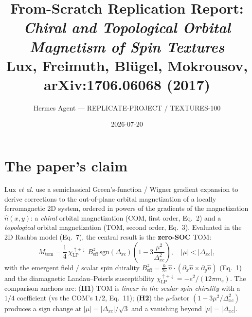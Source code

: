 \documentclass[11pt]{article}
\title{From-Scratch Replication Report:\\
\emph{Chiral and Topological Orbital Magnetism of Spin Textures}\\
\large Lux, Freimuth, Bl\"ugel, Mokrousov, arXiv:1706.06068 (2017)}
\author{Hermes Agent --- REPLICATE-PROJECT / TEXTURES-100}
\date{2026-07-20}
\begin{document}
\maketitle

\begin{abstract}
\noindent{}
\end{abstract}

\section{The paper's claim}
Lux \emph{et al.} use a semiclassical Green's-function / Wigner gradient expansion
to derive corrections to the out-of-plane orbital magnetization of a locally
ferromagnetic 2D system, ordered in powers of the gradients of the magnetization
$\hat n(x,y)$: a \emph{chiral} orbital magnetization (COM, first order, Eq.~2) and
a \emph{topological} orbital magnetization (TOM, second order, Eq.~3). Evaluated
in the 2D Rashba model (Eq.~7), the central result is the \textbf{zero-SOC} TOM:
\begin{equation}
M_{\mathrm{tom}} = \frac14\,\chi_{\mathrm{LP}}^{\uparrow+\downarrow}\,
B_{\mathrm{eff}}^{z}\,\mathrm{sgn}(\Delta_{xc})\left(1-3\frac{\mu^2}{\Delta_{xc}^2}\right),
\quad |\mu|<|\Delta_{xc}|,
\end{equation}
with the emergent field / scalar spin chirality
$B_{\mathrm{eff}}^{z}=\tfrac{\hbar}{2e}\,\hat n\cdot(\partial_x\hat n\times\partial_y\hat n)$
(Eq.~1) and the diamagnetic Landau--Peierls susceptibility
$\chi_{\mathrm{LP}}^{\uparrow+\downarrow}=-e^2/(12\pi m_e)$. The comparison anchors are:
(\textbf{H1}) TOM is \emph{linear in the scalar spin chirality} with a $1/4$
coefficient (vs the COM's $1/2$, Eq.~11); (\textbf{H2}) the $\mu$-factor
$(1-3\mu^2/\Delta_{xc}^2)$ produces a sign change at $|\mu|=|\Delta_{xc}|/\sqrt3$
and a vanishing beyond $|\mu|=|\Delta_{xc}|$.
\end{document}
